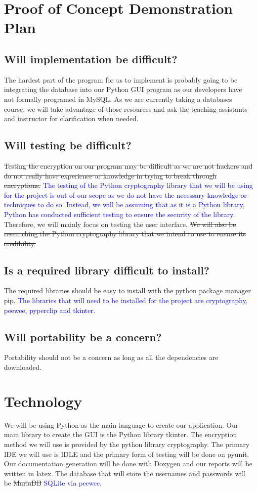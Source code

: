 \documentclass{article}
\begin{document}
\section{Proof of Concept Demonstration Plan}
\subsection{Will implementation be difficult?}
The hardest part of the program for us to implement is probably going to be integrating the database into our Python GUI program as our developers have not formally programed in MySQL. As we are currently taking a databases course, we will take advantage of those resources and ask the teaching assistants and instructor for clarification when needed.
\subsection{Will testing be difficult?}
\sout{Testing the encryption on our program may be difficult as we are not hackers and do not really have experience or knowledge in trying to break through encryptions.} \textcolor{blue}{The testing of the Python cryptography library that we will be using for the project is out of our scope as we do not have the necessary knowledge or techniques to do so. Instead, we will be assuming that as it is a Python library, Python has conducted sufficient testing to ensure the security of the library.} Therefore, we will mainly focus on testing the user interface. \sout{We will also be researching the Python cryptography library that we intend to use to ensure its credibility.}
\subsection{Is a required library difficult to install?}
The required libraries should be easy to install with the python package manager pip. \textcolor{blue}{The libraries that will need to be installed for the project are cryptography, peewee, pyperclip and tkinter.}
\subsection{Will portability be a concern?}
Portability should not be a concern as long as all the dependencies are downloaded.

\section{Technology}
We will be using Python as the main language to create our application. Our main library to create the GUI is the Python library tkinter. The encryption method we will use is provided by the python library cryptography. The primary IDE we will use is IDLE and the primary form of testing will be done on pyunit. Our documentation generation will be done with Doxygen and our reports will be written in latex. The database that will store the usernames and passwords will be \sout{MariaDB} \textcolor{blue}{SQLite via peewee}.
\end{document}
